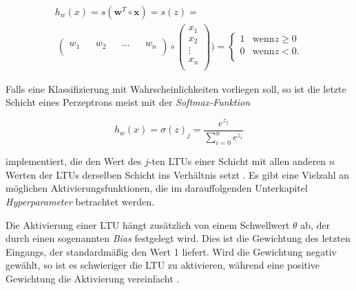 \begin{equation} \label{heaviside}
\begin{split}
h_{w}(x) = s(\boldsymbol{w}^{T} \circ \boldsymbol{x}) = s(z) = \\\ \begin{pmatrix} 
w_{1}&&w_{2}&&\dots&& w_{n}\\ 
\end{pmatrix} 
\circ 
\begin{pmatrix} x_{1}\\
x_{2}\\
\vdots\\
x_{n}\\
\end{pmatrix}) = 
\begin{cases}
1 & \text{wenn} z \geq 0 \\
0 & \text{wenn} z < 0 .\\
\end{cases}
\end{split}
\end{equation}

Falls eine Klassifizierung mit Wahrscheinlichkeiten vorliegen soll, so ist die letzte Schicht eines Perzeptrons meist mit der \textit{Softmax-Funktion}

\begin{equation} \label{softmax}
h_{w}(x) = \sigma(z)_j = \frac{e^{z_j}}{\sum_{i=0}^n e^{z_i} }
\end{equation}

implementiert, die den Wert des $j$-ten LTUs einer Schicht mit allen anderen $n$ Werten der LTUs derselben Schicht ins Verhältnis setzt \cite{AurelienGeron.2018}. Es gibt eine Vielzahl an möglichen Aktivierungsfunktionen, die im darauffolgenden Unterkapitel \textit{Hyperparameter} betrachtet werden.


Die Aktivierung einer LTU hängt zusätzlich von einem Schwellwert $\theta$ ab, der durch einen sogenannten \textit{Bias} festgelegt wird. Dies ist die Gewichtung des letzten Eingangs, der standardmäßig den Wert 1 liefert. Wird die Gewichtung negativ gewählt, so ist es schwieriger die LTU zu aktivieren, während eine positive Gewichtung die Aktivierung vereinfacht \cite{AurelienGeron.2018}.

